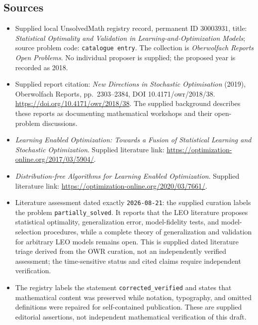 \documentclass[11pt]{article}
\begin{document}
\subsection{Sources}
\begin{itemize}
\item Supplied local UnsolvedMath registry record, permanent ID \(30003931\), title: \emph{Statistical Optimality and Validation in Learning-and-Optimization Models}; source problem code: \texttt{catalogue entry}. The collection is \emph{Oberwolfach Reports Open Problems}. No individual proposer is supplied; the proposed year is recorded as 2018.
\item Supplied report citation: \emph{New Directions in Stochastic Optimisation} (2019), Oberwolfach Reports, pp.\ 2303--2384, DOI 10.4171/owr/2018/38. \url{https://doi.org/10.4171/owr/2018/38}. The supplied background describes these reports as documenting mathematical workshops and their open-problem discussions.
\item \emph{Learning Enabled Optimization: Towards a Fusion of Statistical Learning and Stochastic Optimization}. Supplied literature link: \url{https://optimization-online.org/2017/03/5904/}.
\item \emph{Distribution-free Algorithms for Learning Enabled Optimization}. Supplied literature link: \url{https://optimization-online.org/2020/03/7661/}.
\item Literature assessment dated exactly \texttt{2026-08-21}: the supplied curation labels the problem \texttt{partially\_solved}. It reports that the LEO literature proposes statistical optimality, generalization error, model-fidelity tests, and model-selection procedures, while a complete theory of generalization and validation for arbitrary LEO models remains open. This is supplied dated literature triage derived from the OWR curation, not an independently verified assessment; the time-sensitive status and cited claims require independent verification.
\item The registry labels the statement \texttt{corrected\_verified} and states that mathematical content was preserved while notation, typography, and omitted definitions were repaired for self-contained publication. These are supplied editorial assertions, not independent mathematical verification of this draft.
\end{itemize}
\end{document}
